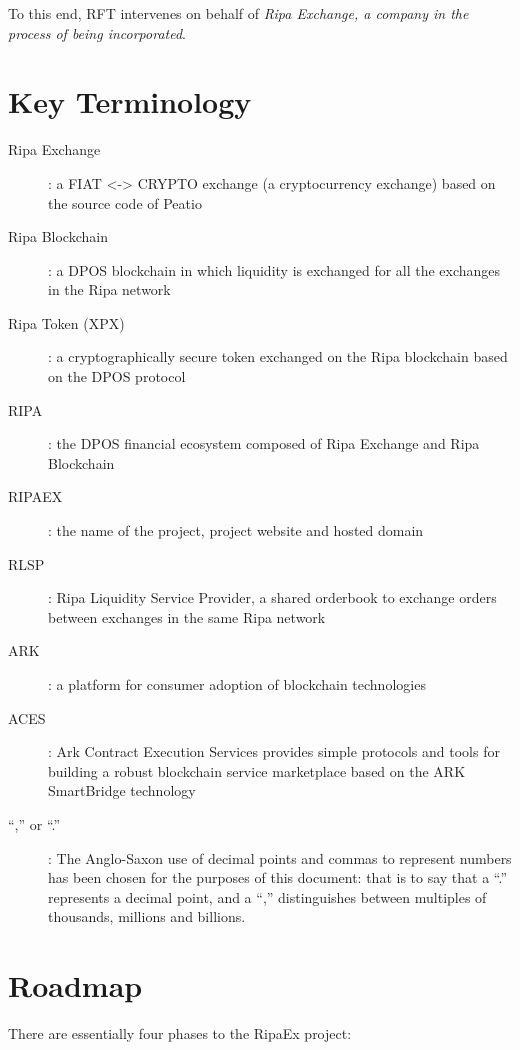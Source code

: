 \documentclass[11pt,fleqn,oneside]{book} %
\begin{document}
To this end, RFT intervenes on behalf of \emph{Ripa Exchange, a company in the process of being incorporated}.





\section{Key Terminology}
\begin{description}
	\item[Ripa Exchange]: a FIAT <-> CRYPTO exchange (a cryptocurrency exchange) based on the source code
	of Peatio \cite{peatio}
	\item[Ripa Blockchain]: a DPOS blockchain in which liquidity is exchanged for all the exchanges in the Ripa network
	\item[Ripa Token (XPX)]: a cryptographically secure token exchanged on the Ripa blockchain based on the DPOS protocol
	\item[RIPA]: the DPOS financial ecosystem composed of Ripa Exchange and Ripa Blockchain
	\item[RIPAEX]: the name of the project, project website and hosted domain
    \item[RLSP]: Ripa Liquidity Service Provider, a shared orderbook to exchange orders between exchanges in the same Ripa network
	\item[ARK]: a platform for consumer adoption of blockchain technologies \cite{ark}
	\item[ACES]: Ark Contract Execution Services \cite{aces} provides simple protocols and tools for building a robust 
	blockchain service marketplace based on the ARK SmartBridge technology
    \item[“,” or “.”]: The Anglo-Saxon use of decimal points and commas to represent numbers has
been chosen for the purposes of this document: that is to say that a “.” represents a decimal point, and a “,”
distinguishes between multiples of thousands, millions and billions.
    \end{description}


\section{Roadmap}
There are essentially four phases to the RipaEx project:
\end{document}
